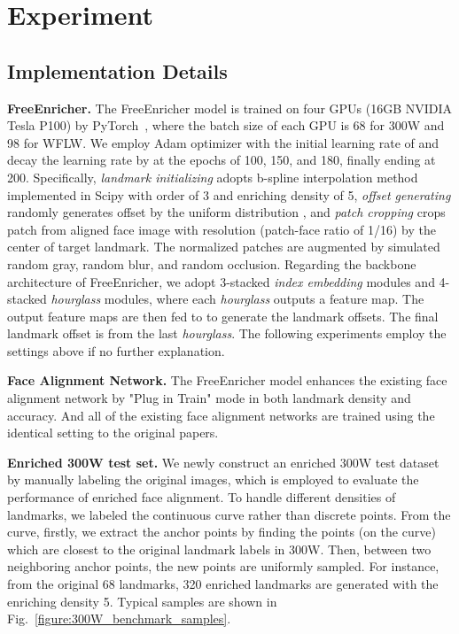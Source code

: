 \documentclass[letterpaper]{article} \usepackage{aaai23}  \usepackage{times}  \usepackage{helvet}  \usepackage{courier}  \usepackage[hyphens]{url}  \usepackage{graphicx} \urlstyle{rm} \def\UrlFont{\rm}  \usepackage{natbib}  \usepackage{caption} \frenchspacing  \setlength{\pdfpagewidth}{8.5in}  \setlength{\pdfpageheight}{11in}  \usepackage{algorithm}
\begin{document}
\section{Experiment}
\label{sec:experiment}

\subsection{Implementation Details}
\label{sec:experiment_setting}



\vspace{5pt}
\noindent\textbf{FreeEnricher.} 
The FreeEnricher model is trained on four GPUs (16GB NVIDIA Tesla P100) by PyTorch~\cite{paszke2019pytorch}, where the batch size of each GPU is 68 for 300W and 98 for WFLW.
We employ Adam optimizer with the initial learning rate of  and decay the learning rate by  at the epochs of 100, 150, and 180, finally ending at 200.
Specifically,
\emph{landmark initializing} adopts b-spline interpolation method implemented in Scipy \cite{virtanen2020scipy} with order of 3 and enriching density of 5,
\emph{offset generating} randomly generates offset by the uniform distribution , and
\emph{patch cropping} crops  patch from aligned face image with  resolution (patch-face ratio of 1/16) by the center of target landmark.
The normalized patches are augmented by simulated random gray, random blur, and random occlusion.
Regarding the backbone architecture of FreeEnricher, we adopt 3-stacked \emph{index embedding} modules and 4-stacked \emph{hourglass} modules,
where each \emph{hourglass} outputs a  feature map.
The output feature maps are then fed to  \cite{huang2021adnet} to generate the landmark offsets. The final landmark offset is from the last \emph{hourglass}.
The following experiments employ the settings above if no further explanation.

\vspace{5pt}
\noindent\textbf{Face Alignment Network.} The FreeEnricher model enhances the existing face alignment network by "Plug in Train" mode in both landmark density and accuracy. And all of the existing face alignment networks are trained using the identical setting to the original papers.

\vspace{5pt}
\noindent\textbf{Enriched 300W test set.} We newly construct an enriched 300W test dataset by manually labeling the original images, which is employed to evaluate the performance of enriched face alignment. 
To handle different densities of landmarks, we labeled the continuous curve rather than discrete points.
From the curve, firstly, we extract the anchor points by finding the points (on the curve) which are closest to the original landmark labels in 300W.
Then, between two neighboring anchor points, the new points are uniformly sampled.
For instance, from the original 68 landmarks, 320 enriched landmarks are generated with the enriching density 5.
Typical samples are shown in Fig.~\ref{figure:300W_benchmark_samples}.
\end{document}
